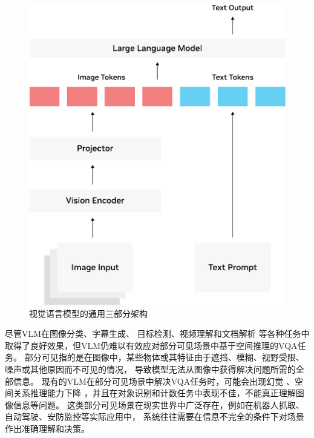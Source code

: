 \begin{figure}[htb]
    \centering
    \includegraphics[scale=0.6]{figures/vlm-architecture-diagram-crop.pdf}
    \caption{视觉语言模型的通用三部分架构}
    \label{fig:vlm-architecture}
\end{figure}

尽管VLM在图像分类\cite{pratt2023does}、字幕生成\cite{alaluf2024myvlm}、
目标检测\cite{kuo2022f}、视频理解\cite{huang2024lita}和文档解析\cite{lv2023kosmos}
等各种任务中取得了良好效果，但VLM仍难以有效应对部分可见场景中基于空间推理的VQA任务。
部分可见指的是在图像中，某些物体或其特征由于遮挡、模糊、视野受限、噪声或其他原因而不可见的情况，
导致模型无法从图像中获得解决问题所需的全部信息。
现有的VLM在部分可见场景中解决VQA任务时，可能会出现幻觉\cite{vardi2025clipupclipbasedunanswerableproblem}
、空间关系推理能力下降\cite{chen2024spatialvlmendowingvisionlanguagemodels}\cite{anis2025limitationsvisionlanguagemodelsunderstanding}
，并且在对象识别和计数任务中表现不佳\cite{campbell2024understandinglimitsvisionlanguage}，不能真正理解图像信息\cite{rahmanzadehgervi2025visionlanguagemodelsblind}等问题。
这类部分可见场景在现实世界中广泛存在，例如在机器人抓取、自动驾驶、安防监控等实际应用中，
系统往往需要在信息不完全的条件下对场景作出准确理解和决策。

